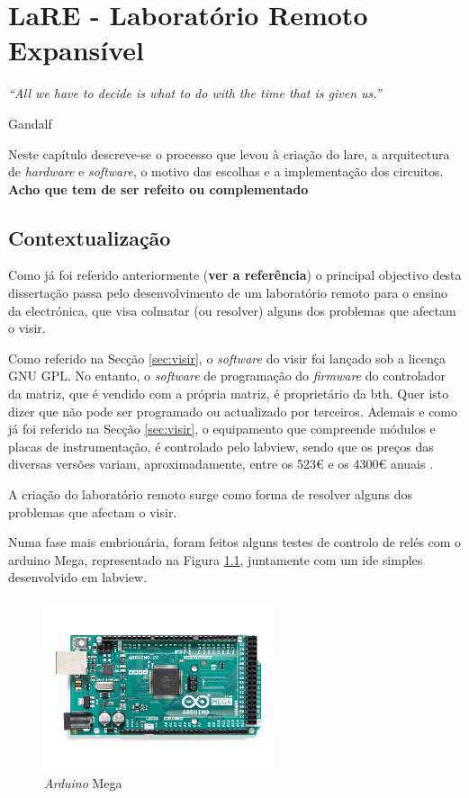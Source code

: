 \chapter{LaRE - Laboratório Remoto Expansível}
\label{Capítulo3}
\begin{center}
    \textit{``All we have to decide is what to do with the time that is given us.''}

    Gandalf
\end{center}

Neste capítulo descreve-se o processo que levou à criação do \acrshort{lare}, a arquitectura de \textit{hardware} e \textit{software}, o motivo das escolhas e a implementação dos circuitos. \textbf{Acho que tem de ser refeito ou complementado}

\section{Contextualização}
\label{sec:contextualização}
Como já foi referido anteriormente (\textbf{ver a referência}) o principal objectivo desta dissertação passa pelo desenvolvimento de um \acrshort{laboratório remoto} para o ensino da electrónica, que visa colmatar (ou resolver) alguns dos problemas que afectam o \acrshort{visir}.

Como referido na Secção \ref{sec:visir}, o \textit{software} do \acrshort{visir} foi lançado sob a licença GNU GPL. No entanto, o \textit{software} de programação do \textit{firmware} do controlador da matriz, que é vendido com a própria matriz, é proprietário da \acrshort{bth}. Quer isto dizer que não pode ser programado ou actualizado por terceiros. Ademais e como já foi referido na Secção \ref{sec:visir}, o equipamento que compreende módulos e placas de instrumentação, é controlado pelo \acrshort{labview}, sendo que os preços das diversas versões variam, aproximadamente, entre os 523€ e os 4300€ anuais \cite{labviewpricing}.

A criação do \acrshort{laboratório remoto} surge como forma de resolver alguns dos problemas que afectam o \acrshort{visir}.

Numa fase mais embrionária, foram feitos alguns testes de controlo de relés com o \gls{arduino} Mega, representado na Figura \ref{fig:arduinomega}, juntamente com um \acrfull{ide} simples desenvolvido em \acrshort{labview}.

\begin{figure}[hbtp]
    \centering
    \includegraphics[width=0.6\textwidth]{figures/arduinomega.png}
    \caption{\textit{Arduino} Mega \cite{ArduinoMega}}
    \label{fig:arduinomega}
\end{figure}

